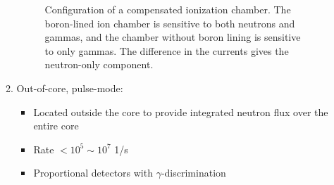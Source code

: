 \begin{itemize}
\begin{enumerate}
\begin{figure}[ht]
            \caption{Configuration of a compensated ionization chamber. The boron-lined ion chamber is sensitive to both neutrons and gammas, and the chamber without boron lining is sensitive to only gammas. The difference in the currents gives the neutron-only component.}
            \label{fig:compensated_ion_chamber}
        \end{figure}
        \item Out-of-core, pulse-mode:
        \begin{itemize}
            \item Located outside the core to provide integrated neutron flux over the entire core
            \item Rate $<10^5\sim10^7$ 1/s
            \item Proportional detectors with $\gamma$-discrimination
        \end{itemize}
    \end{enumerate}
\end{itemize}